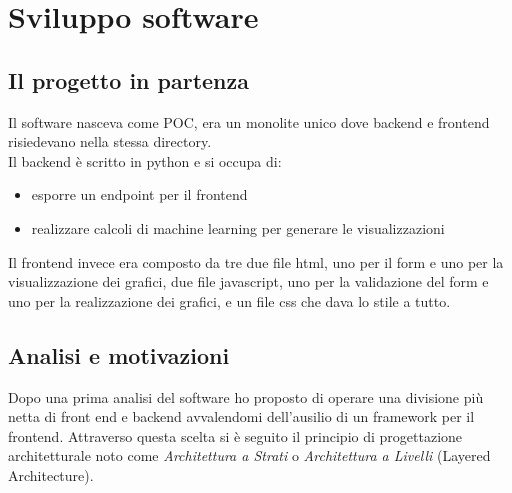 \chapter{Sviluppo software}
\label{cap:sviluppo software}


\section{Il progetto in partenza}
Il software nasceva come POC, era un monolite unico dove backend e frontend risiedevano nella stessa directory.\\
Il backend è scritto in python e si occupa di:
\begin{itemize}
    \item esporre un endpoint per il frontend 
    \item realizzare calcoli di machine learning per generare le visualizzazioni 
\end{itemize}

Il frontend invece era composto da tre due file html, uno per il form e uno per la visualizzazione dei grafici, due file javascript, uno per la validazione del form e uno per la realizzazione dei grafici, e un file css che dava lo stile a tutto. 

\section{Analisi e motivazioni}

Dopo una prima analisi del software ho proposto di operare una divisione più netta di front end e backend avvalendomi dell'ausilio di un framework per il frontend. Attraverso questa scelta si è seguito il principio di progettazione architetturale noto come \textit{Architettura a Strati} o \textit{Architettura a Livelli} (Layered Architecture).

